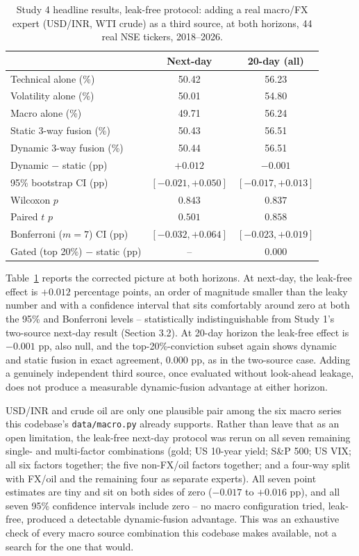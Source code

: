 \documentclass[10pt,a4paper,twocolumn]{article}
\begin{document}
\begin{table}[t]
\centering
\caption{Study 4 headline results, leak-free protocol: adding a real macro/FX expert (USD/INR, WTI crude) as a third source, at both horizons, 44 real NSE tickers, 2018--2026.}
\footnotesize
\begin{tabular}{@{}lcc@{}}
\toprule
& Next-day & 20-day (all) \\
\midrule
Technical alone (\%) & 50.42 & 56.23 \\
Volatility alone (\%) & 50.01 & 54.80 \\
Macro alone (\%) & 49.71 & 56.24 \\
Static 3-way fusion (\%) & 50.43 & 56.51 \\
Dynamic 3-way fusion (\%) & 50.44 & 56.51 \\
\midrule
Dynamic $-$ static (pp) & $+0.012$ & $-0.001$ \\
95\% bootstrap CI (pp) & $[-0.021,+0.050]$ & $[-0.017,+0.013]$ \\
Wilcoxon $p$ & $0.843$ & $0.837$ \\
Paired $t$ $p$ & $0.501$ & $0.858$ \\
Bonferroni ($m{=}7$) CI (pp) & $[-0.032,+0.064]$ & $[-0.023,+0.019]$ \\
Gated (top 20\%) $-$ static (pp) & -- & $0.000$ \\
\bottomrule
\end{tabular}
\label{tab:study4}
\end{table}

Table~\ref{tab:study4} reports the corrected picture at both horizons. At next-day, the leak-free effect is $+0.012$ percentage points, an order of magnitude smaller than the leaky number and with a confidence interval that sits comfortably around zero at both the 95\% and Bonferroni levels -- statistically indistinguishable from Study 1's two-source next-day result (Section 3.2). At 20-day horizon the leak-free effect is $-0.001$ pp, also null, and the top-20\%-conviction subset again shows dynamic and static fusion in exact agreement, $0.000$ pp, as in the two-source case. Adding a genuinely independent third source, once evaluated without look-ahead leakage, does not produce a measurable dynamic-fusion advantage at either horizon.

USD/INR and crude oil are only one plausible pair among the six macro series this codebase's \texttt{data/macro.py} already supports. Rather than leave that as an open limitation, the leak-free next-day protocol was rerun on all seven remaining single- and multi-factor combinations (gold; US 10-year yield; S\&P 500; US VIX; all six factors together; the five non-FX/oil factors together; and a four-way split with FX/oil and the remaining four as separate experts). All seven point estimates are tiny and sit on both sides of zero ($-0.017$ to $+0.016$ pp), and all seven 95\% confidence intervals include zero -- no macro configuration tried, leak-free, produced a detectable dynamic-fusion advantage. This was an exhaustive check of every macro source combination this codebase makes available, not a search for the one that would.
\end{document}
